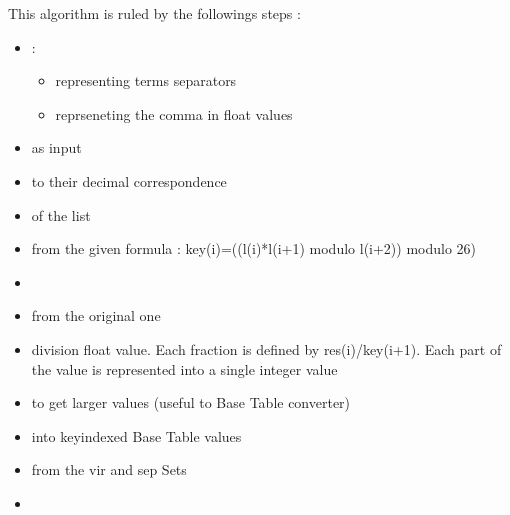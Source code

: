 \documentclass[letterpaper,10pt,english]{sphinxmanual}
\begin{document}
\sphinxAtStartPar
This algorithm is ruled by the followings steps :
\begin{itemize}
\item {} 
\sphinxAtStartPar
{} :
\begin{itemize}
\item {} 
\sphinxAtStartPar
{} representing terms separators

\item {} 
\sphinxAtStartPar
{} reprseneting the comma in float values

\end{itemize}

\item {} 
\sphinxAtStartPar
{} as input

\item {} 
\sphinxAtStartPar
{} to their decimal correspondence

\item {} 
\sphinxAtStartPar
{} of the list

\item {} 
\sphinxAtStartPar
{} from the given formula : key(i)=((l(i)*l(i+1) modulo l(i+2)) modulo 26)

\item {} 
\sphinxAtStartPar
{}

\item {} 
\sphinxAtStartPar
{} from the original one

\item {} 
\sphinxAtStartPar
{} division float value. Each fraction is defined by res(i)/key(i+1). Each part of the value is represented into a single integer value

\item {} 
\sphinxAtStartPar
{} to get larger values (useful to Base Table converter)

\item {} 
\sphinxAtStartPar
{} into key\sphinxhyphen{}indexed Base Table values

\item {} 
\sphinxAtStartPar
{} from the vir and sep Sets

\item {} 
\sphinxAtStartPar
{}

\end{itemize}
\end{document}
